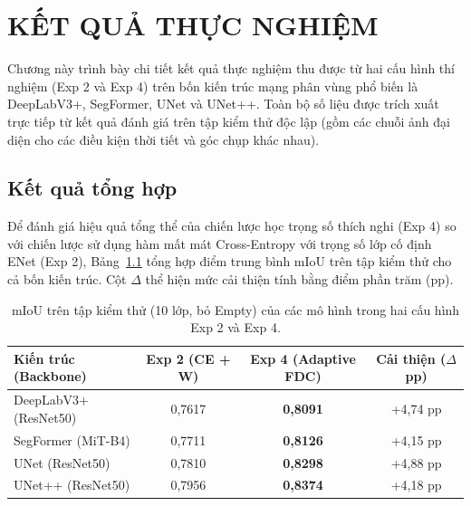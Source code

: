 \chapter{KẾT QUẢ THỰC NGHIỆM}
\label{ch:ket_qua}

Chương này trình bày chi tiết kết quả thực nghiệm thu được từ hai cấu hình thí nghiệm (Exp 2 và Exp 4) trên bốn kiến trúc mạng phân vùng phổ biến là DeepLabV3+, SegFormer, UNet và UNet++. Toàn bộ số liệu được trích xuất trực tiếp từ kết quả đánh giá trên tập kiểm thử độc lập (gồm các chuỗi ảnh đại diện cho các điều kiện thời tiết và góc chụp khác nhau).

\section{Kết quả tổng hợp}
\label{sec:ket_qua_tong_hop}

Để đánh giá hiệu quả tổng thể của chiến lược học trọng số thích nghi (Exp 4) so với chiến lược sử dụng hàm mất mát Cross-Entropy với trọng số lớp cố định ENet (Exp 2), Bảng~\ref{tab:miou_summary} tổng hợp điểm trung bình mIoU trên tập kiểm thử cho cả bốn kiến trúc. Cột $\Delta$ thể hiện mức cải thiện tính bằng điểm phần trăm (pp).

\begin{table}[H]
\centering
\caption{mIoU trên tập kiểm thử (10 lớp, bỏ Empty) của các mô hình trong hai cấu hình Exp 2 và Exp 4.}
\label{tab:miou_summary}
\begin{tabular}{l c c c}
\toprule
\textbf{Kiến trúc (Backbone)} & \textbf{Exp 2 (CE + W)} & \textbf{Exp 4 (Adaptive FDC)} & \textbf{Cải thiện ($\Delta$ pp)} \\
\midrule
DeepLabV3+ (ResNet50) & 0,7617 & \textbf{0,8091} & +4,74 pp \\
SegFormer (MiT-B4)    & 0,7711 & \textbf{0,8126} & +4,15 pp \\
UNet (ResNet50)       & 0,7810 & \textbf{0,8298} & +4,88 pp \\
UNet++ (ResNet50)     & 0,7956 & \textbf{0,8374} & +4,18 pp \\
\bottomrule
\end{tabular}
\end{table}

